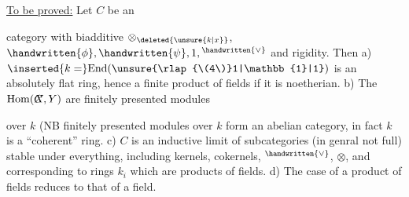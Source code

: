 \uline{To be proved:} Let $C$ be an  category with biadditive $\otimes_{\deleted{\unsure{k|x}}}$, $\handwritten{\phi},\handwritten{\psi},1,{}^{\handwritten{\vee}}$ and rigidity. Then a) $\inserted{k=}\mathrm{End}(\unsure{\rlap{\(4\)}1|\mathbb{1}|1})$ is an absolutely flat ring, hence a finite product of  fields if it is noetherian. b) The $\mathrm{Hom}(\rlap{\(C\)}X,Y)$ are finitely presented modules  \rlap{(}over $k$ (NB finitely presented modules over $k$ form an abelian category, in fact $k$ is a ``coherent'' ring\unsure{\rlap{,})|)}. c)  $C$ is an inductive limit of subcategories (in genral not full) stable under everything, including kernels, cokernels, ${}^{\handwritten{\vee}}$, $\otimes$, and corresponding to rings $k_{i}$ which are  products of fields. d) The case of a product of fields reduces to that of a field.
